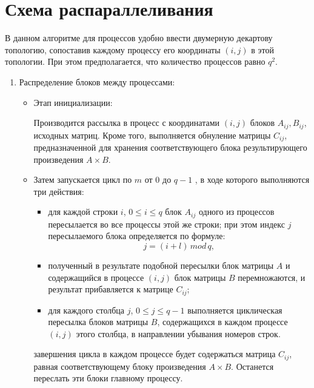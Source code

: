 \documentclass{report}
\begin{document}
\section*{Схема распараллеливания}
В данном алгоритме для процессов удобно ввести двумерную декартову топологию, сопоставив каждому процессу его координаты {\itshape $(i,j)$} в этой топологии. При этом предполагается, что количество процессов равно $q^2$.
\begin{enumerate}
    \item Распределение блоков между процессами:
    \begin{itemize}
        \item Этап инициализации:
        \par Производится рассылка в процесс с координатами {\itshape $(i,j)$} блоков {\itshape $A_{ij}, B_{ij}$},  исходных матриц. Кроме того, выполняется обнуление матрицы {\itshape $C_{ij}$}, предназначенной для хранения соответствующего блока результирующего произведения {\itshape $A  \times B$}.
        \item Затем запускается цикл по {\itshape $m$} от {\itshape $0$} до {\itshape $q - 1$} , в ходе которого выполняются три действия:
         \begin{itemize}
            \item для каждой строки {\itshape $i$}, {\itshape $0 \le i \le q$} блок {\itshape $A_{ij}$} одного из процессов пересылается во все процессы этой же строки; при этом индекс {\itshape $j$} пересылаемого блока определяется по формуле:
                 $$
                {\mathit j = (i + l) \, mod \, q,}
                $$
            \item полученный в результате подобной пересылки блок матрицы {\itshape $A$} и содержащийся в процессе {\itshape $(i,j)$} блок матрицы {\itshape $B$} перемножаются, и результат прибавляется к матрице {\itshape $C_{ij}$}; 
            \item для каждого столбца {\itshape $j$}, {\itshape $0 \le j \le q - 1$} выполняется циклическая пересылка блоков матрицы {\itshape $B$}, содержащихся в каждом процессе {\itshape $(i,j)$} этого столбца, в направлении убывания номеров строк.
        \end{itemize}
     завершения цикла в каждом процессе будет содержаться матрица {\itshape $C_{ij}$}, равная соответствующему блоку произведения {\itshape $A  \times B$}. Останется переслать эти блоки главному процессу.
    \end{itemize}

\end{enumerate}
\end{document}
